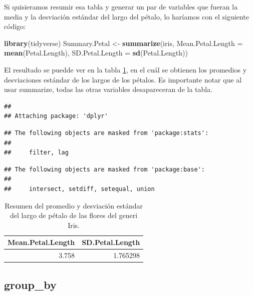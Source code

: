 \documentclass[]{book}
\newenvironment{Shaded}{\begin{snugshade}}{\end{snugshade}}
\newcommand{\DataTypeTok}[1]{\textcolor[rgb]{0.13,0.29,0.53}{#1}}
\newcommand{\KeywordTok}[1]{\textcolor[rgb]{0.13,0.29,0.53}{\textbf{#1}}}
\newcommand{\NormalTok}[1]{#1}
\newcommand{\StringTok}[1]{\textcolor[rgb]{0.31,0.60,0.02}{#1}}
\begin{document}
Si quisieramos resumir esa tabla y generar un par de variables que
fueran la media y la desviación estándar del largo del pétalo, lo
haríamos con el siguiente código:

\begin{Shaded}
\begin{Highlighting}[]
\KeywordTok{library}\NormalTok{(tidyverse)}
\NormalTok{Summary.Petal <-}\StringTok{ }\KeywordTok{summarize}\NormalTok{(iris, }\DataTypeTok{Mean.Petal.Length =} \KeywordTok{mean}\NormalTok{(Petal.Length), }
    \DataTypeTok{SD.Petal.Length =} \KeywordTok{sd}\NormalTok{(Petal.Length))}
\end{Highlighting}
\end{Shaded}

El resultado se puedde ver en la tabla \ref{tab:SummaryPetaltab}, en el
cuál se obtienen los promedios y desviaciones estándar de los largos de
los pétalos. Es importante notar que al usar summarize, todas las otras
variables desapareceran de la tabla.

\begin{verbatim}
## 
## Attaching package: 'dplyr'
\end{verbatim}

\begin{verbatim}
## The following objects are masked from 'package:stats':
## 
##     filter, lag
\end{verbatim}

\begin{verbatim}
## The following objects are masked from 'package:base':
## 
##     intersect, setdiff, setequal, union
\end{verbatim}

\begin{table}

\caption{\label{tab:SummaryPetaltab}Resumen del promedio y desviación estándar del largo de pétalo de las flores del generi Iris.}
\centering
\begin{tabular}[t]{rr}
\toprule
Mean.Petal.Length & SD.Petal.Length\\
\midrule
3.758 & 1.765298\\
\bottomrule
\end{tabular}
\end{table}

\hypertarget{group_by}{%
\subsection{group\_by}\label{group_by}}
\end{document}
